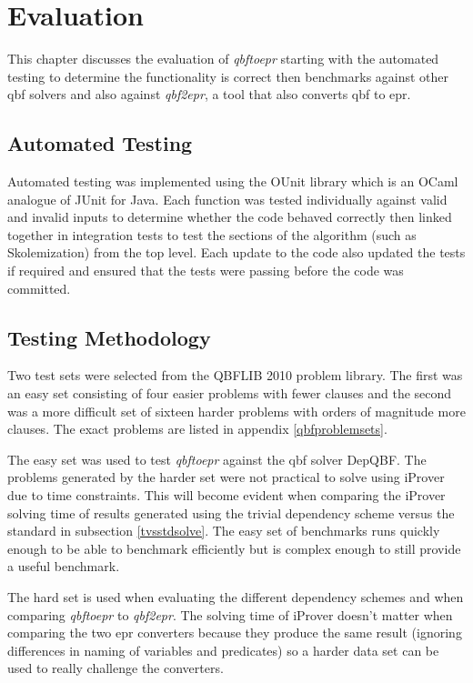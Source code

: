 \chapter{Evaluation} \label{evaluation}
This chapter discusses the evaluation of \textit{qbftoepr} starting with the automated testing to determine the functionality is correct then benchmarks against other \gls{qbf} solvers and also against \textit{qbf2epr}, a tool that also converts \gls{qbf} to \gls{epr}.

\section{Automated Testing}
Automated testing was implemented using the OUnit library which is an OCaml analogue of JUnit for Java. Each function was tested individually against valid and invalid inputs to determine whether the code behaved correctly then linked together in integration tests to test the sections of the algorithm (such as Skolemization) from the top level. Each update to the code also updated the tests if required and ensured that the tests were passing before the code was committed.

\section{Testing Methodology}
Two test sets were selected from the QBFLIB 2010 problem library. The first was an easy set consisting of four easier problems with fewer clauses and the second was a more difficult set of sixteen harder problems with orders of magnitude more clauses. The exact problems are listed in appendix \ref{qbfproblemsets}.

The easy set was used to test \textit{qbftoepr} against the \gls{qbf} solver DepQBF. The problems generated by the harder set were not practical to solve using iProver due to time constraints. This will become evident when comparing the iProver solving time of results generated using the trivial dependency scheme versus the standard in subsection \ref{tvsstdsolve}. The easy set of benchmarks runs quickly enough to be able to benchmark efficiently but is complex enough to still provide a useful benchmark.

The hard set is used when evaluating the different dependency schemes and when comparing \textit{qbftoepr} to \textit{qbf2epr}. The solving time of iProver doesn't matter when comparing the two \gls{epr} converters because they produce the same result (ignoring differences in naming of variables and predicates) so a harder data set can be used to really challenge the converters.

